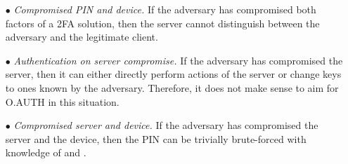 \begin{itemize}
\item[$\bullet$]\textit{Compromised PIN and device.}
If the adversary has compromised both factors of a 2FA solution, then the server cannot distinguish between the adversary and the legitimate client.

\item[$\bullet$]\textit{Authentication on server compromise.}
If the adversary has compromised the server, then it can either directly perform actions of the server or change keys to ones known by the adversary. Therefore, it does not make sense to aim for O.AUTH in this situation.

\item[$\bullet$]\textit{Compromised server and device.}
If the adversary has compromised the server and the device, then the PIN can be trivially brute-forced with knowledge of \VS{\verifier} and \VC{\salt}. %
\end{itemize}

